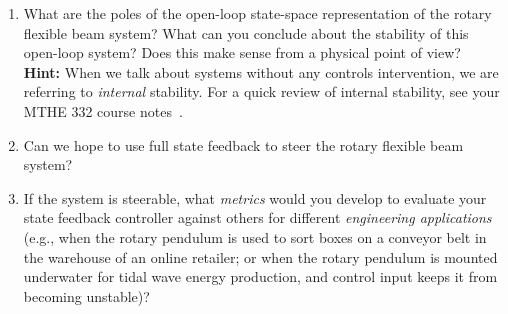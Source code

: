 \documentclass[12pt]{report}
\newcommand\drew[1]{\textcolor{red}{#1}}
\begin{document}
\begin{enumerate}
    \item What are the poles of the open-loop state-space representation of the rotary flexible beam system? What can you conclude about the stability of this open-loop system? Does this make sense from a physical point of view?\\
          \textbf{Hint:} When we talk about systems without any controls intervention, we are referring to \emph{internal} stability. For a quick review of internal stability, see your MTHE 332 course notes~\cite[p. 162]{AL:04}.\\
    \item Can we hope to use full state feedback to steer the rotary flexible beam system?\\
    \item If the system is steerable, what \emph{metrics} would you develop to evaluate your state feedback controller against others for different \emph{engineering applications} (e.g., when the rotary pendulum is used to sort boxes on a conveyor belt in the warehouse of an online retailer; or when the rotary pendulum is mounted underwater for tidal wave energy production, and control input keeps it from becoming unstable)?\\
\end{enumerate}
\end{document}
